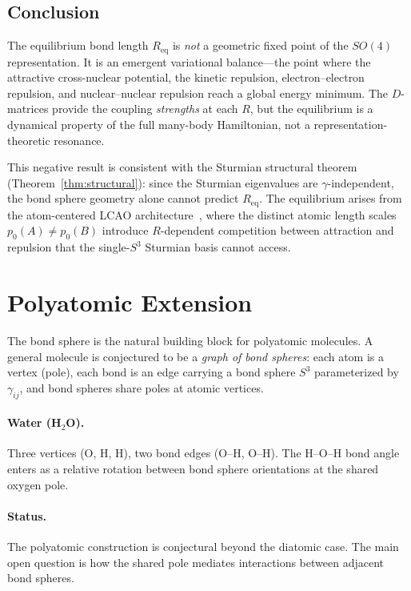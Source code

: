 \documentclass[aps,pra,twocolumn,superscriptaddress,longbibliography]{revtex4-2}
\begin{document}
\subsection{Conclusion}

The equilibrium bond length $R_{\text{eq}}$ is \emph{not} a geometric
fixed point of the $SO(4)$ representation.  It is an emergent variational
balance---the point where the attractive cross-nuclear potential, the
kinetic repulsion, electron--electron repulsion, and nuclear--nuclear
repulsion reach a global energy minimum.  The $D$-matrices provide the
coupling \emph{strengths} at each $R$, but the equilibrium is a
dynamical property of the full many-body Hamiltonian, not a
representation-theoretic resonance.

This negative result is consistent with the Sturmian structural theorem
(Theorem~\ref{thm:structural}): since the Sturmian eigenvalues are
$\gamma$-independent, the bond sphere geometry alone cannot predict
$R_{\text{eq}}$.  The equilibrium arises from the atom-centered LCAO
architecture~\cite{loutey_fci}, where the distinct atomic length scales
$p_0(A) \neq p_0(B)$ introduce $R$-dependent competition between
attraction and repulsion that the single-$S^3$ Sturmian basis cannot
access.


\section{Polyatomic Extension}
\label{sec:polyatomic}

The bond sphere is the natural building block for polyatomic molecules.
A general molecule is conjectured to be a \emph{graph of bond spheres}:
each atom is a vertex (pole), each bond is an edge carrying a bond
sphere $S^3$ parameterized by $\gamma_{ij}$, and bond spheres share
poles at atomic vertices.

\paragraph{Water (H$_2$O).}  Three vertices (O, H, H), two bond edges
(O--H, O--H).  The H--O--H bond angle enters as a relative rotation
between bond sphere orientations at the shared oxygen pole.

\paragraph{Status.}  The polyatomic construction is conjectural beyond
the diatomic case.  The main open question is how the shared pole
mediates interactions between adjacent bond spheres.
\end{document}
